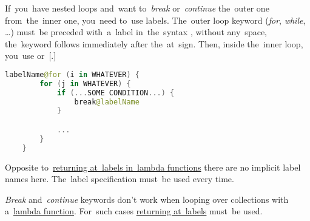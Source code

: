 If~you~have nested loops and~want to~\textit{break} or~\textit{continue} the~outer one from~the~inner one, you~need to~use labels.
The~outer loop keyword (\textit{for}, \textit{while}, \dots) must~be preceded with~a~label in~the~syntax , without any~space, the~keyword follows immediately after the~at~sign.
Then, inside the~inner loop, you~use  or~[.]
\newline

\begin{lstlisting}[language=Kotlin]
    labelName@for (i in WHATEVER) {
        for (j in WHATEVER) {
            if (...SOME CONDITION...) {
                break@labelName
            }

            ...
        }
    }
\end{lstlisting}
\newline

\note Opposite to~\hyperref[kotlinreturnatlabel]{returning at~labels in~lambda functions} there are no implicit label names here.
The~label specification  must~be used every time.
\newline

\warning \textit{Break} and~\textit{continue} keywords don't work when looping over collections with a~\hyperref[kotlinlambda]{lambda function}.
For~such cases \hyperref[kotlinreturnatlabel]{returning at~labels} must~be used.
\newpage
